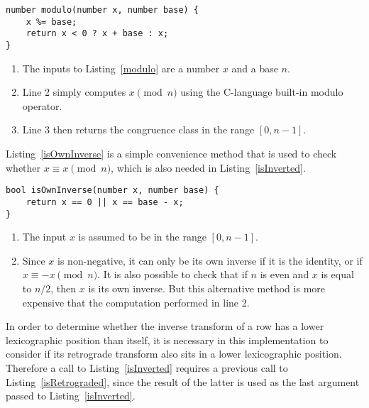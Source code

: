 \begin{lstlisting}[caption={A subroutine to compute $x \pmod{n}$ such that the result is non-negative.},label={modulo}]
number modulo(number x, number base) {
    x %= base;
    return x < 0 ? x + base : x;
}
\end{lstlisting}

\begin{enumerate}
\item The inputs to Listing~\ref{modulo} are a number $x$ and a base $n$.
\item Line 2 simply computes $x \pmod{n}$ using the C-language built-in modulo operator.
\item Line 3 then returns the congruence class in the range $[0, n - 1]$.
\end{enumerate}

Listing~\ref{isOwnInverse} is a simple convenience method that is used to check whether $x \equiv x \pmod{n}$, which is also needed in Listing~\ref{isInverted}.

\begin{lstlisting}[caption={A subroutine that returns true if a pitch-class is its own inverse.},label={isOwnInverse}]
bool isOwnInverse(number x, number base) {
    return x == 0 || x == base - x;
}
\end{lstlisting}

\begin{enumerate}
\item The input $x$ is assumed to be in the range $[0, n - 1]$.
\item Since $x$ is non-negative, it can only be its own inverse if it is the identity, or if $x \equiv -x \pmod{n}$. It is also possible to check that if $n$ is even and $x$ is equal to $n / 2$, then $x$ is its own inverse. But this alternative method is more expensive that the computation performed in line 2.
\end{enumerate}

In order to determine whether the inverse transform of a row has a lower lexicographic position than itself, it is necessary in this implementation to consider if its retrograde transform also sits in a lower lexicographic position. Therefore a call to Listing~\ref{isInverted} requires a previous call to Listing~\ref{isRetrograded}, since the result of the latter is used as the last argument passed to Listing~\ref{isInverted}.

